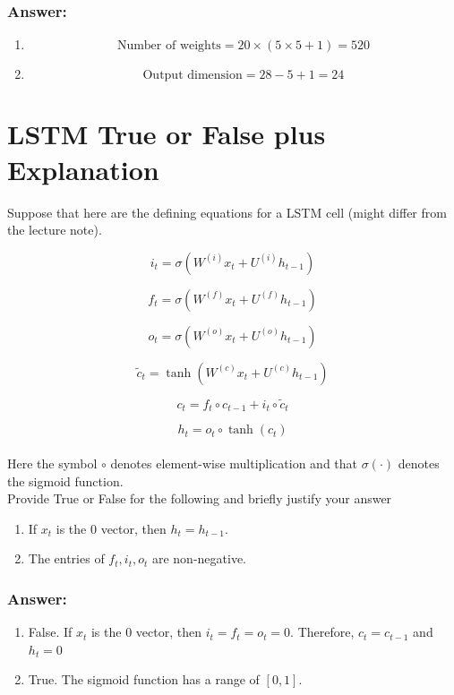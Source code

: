 \documentclass{article}
\begin{document}
\subsubsection*{Answer:}
\begin{enumerate}[label= (\alph*)]
    \item \begin{equation*}
        \text{Number of weights} = 20 \times (5 \times 5 + 1) = 520
    \end{equation*}
    \item \begin{equation*}
        \text{Output dimension} = 28 - 5 + 1 = 24
    \end{equation*}
\end{enumerate}

\section{LSTM True or False plus Explanation}

Suppose that here are the defining equations for a LSTM cell (might differ from the lecture note).

\begin{equation}
        i_t = \sigma(W^{(i)} x_t + U^{(i)} h_{t-1}) 
\end{equation}

\begin{equation}
    f_t = \sigma(W^{(f)} x_t + U^{(f)} h_{t-1}) 
\end{equation}

\begin{equation}
    o_t = \sigma(W^{(o)} x_t + U^{(o)} h_{t-1}) 
\end{equation}

\begin{equation}
    \tilde{c}_t = \tanh(W^{(c)} x_t + U^{(c)} h_{t-1}) 
\end{equation}

\begin{equation}
    c_t = f_t \circ c_{t-1} + i_t \circ \tilde{c}_t 
\end{equation}

\begin{equation}
    h_t = o_t \circ \tanh(c_t)
\end{equation}
\\
Here the symbol $\circ$ denotes element-wise multiplication and that $\sigma(\cdot)$ denotes the sigmoid function.
\\
Provide True or False for the following and briefly justify your answer
\begin{enumerate}[label= (\alph*)]
    \item If $x_t$ is the 0 vector, then $h_t = h_{t-1}$.
    \item The entries of $f_t,i_t,o_t$ are non-negative.
\end{enumerate}

\subsubsection*{Answer:}
\begin{enumerate}[label= (\alph*)]
    \item False. If $x_t$ is the 0 vector, then $i_t = f_t = o_t = 0$. Therefore, $c_t = c_{t-1}$ and $h_t = 0$
    \item True. The sigmoid function has a range of $[0, 1]$.
\end{enumerate}
\end{document}
